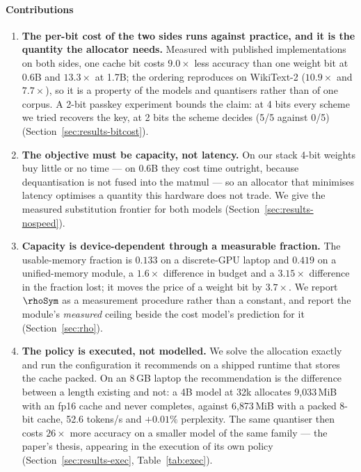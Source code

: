 \paragraph*{Contributions}
\begin{enumerate}
\item \textbf{The per-bit cost of the two sides runs against practice, and it is
      the quantity the allocator needs.} Measured with published implementations
      on both sides, one cache bit costs $9.0\times$ less accuracy than one
      weight bit at 0.6B and $13.3\times$ at 1.7B; the ordering reproduces on
      WikiText-2 ($10.9\times$ and $7.7\times$), so it is a property of the
      models and quantisers rather than of one corpus. A 2-bit passkey
      experiment bounds the claim: at 4 bits every scheme we tried recovers the
      key, at 2 bits the scheme decides (5/5 against 0/5)
      (Section~\ref{sec:results-bitcost}).

\item \textbf{The objective must be capacity, not latency.} On our stack 4-bit
      weights buy little or no time --- on 0.6B they cost time outright, because
      dequantisation is not fused into the matmul --- so an allocator that
      minimises latency optimises a quantity this hardware does not trade. We
      give the measured substitution frontier for both models
      (Section~\ref{sec:results-nospeed}).

\item \textbf{Capacity is device-dependent through a measurable fraction.} The
      usable-memory fraction is $0.133$ on a discrete-GPU laptop and $0.419$ on
      a unified-memory module, a $1.6\times$ difference in budget and a
      $3.15\times$ difference in the fraction lost; it moves the price of a
      weight bit by $3.7\times$. We report $\rhoSym$ as a measurement procedure
      rather than a constant, and report the module's \emph{measured} ceiling
      beside the cost model's prediction for it (Section~\ref{sec:rho}).

\item \textbf{The policy is executed, not modelled.} We solve the allocation
      exactly and run the configuration it recommends on a shipped runtime that
      stores the cache packed. On an 8\,GB laptop the recommendation is the
      difference between a length existing and not: a 4B model at 32k allocates
      9{,}033\,MiB with an fp16 cache and never completes, against 6{,}873\,MiB
      with a packed 8-bit cache, 52.6 tokens/s and $+0.01\%$ perplexity. The same
      quantiser then costs $26\times$ more accuracy on a smaller model of the same
      family --- the paper's thesis, appearing in the execution of its own policy
      (Section~\ref{sec:results-exec}, Table~\ref{tab:exec}).


\end{enumerate}
